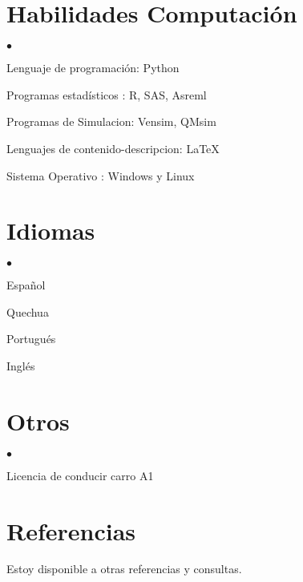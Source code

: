 \documentclass[margin,line,10pt]{res}
\newenvironment{list2}{
  \begin{list}{$\bullet$}{%
      \setlength{\itemsep}{0in}
      \setlength{\parsep}{0in} \setlength{\parskip}{0in}
      \setlength{\topsep}{0in} \setlength{\partopsep}{0in} 
      \setlength{\leftmargin}{0.2in}}}{\end{list}}
\begin{document}
\begin{resume}
\section{\sc Habilidades Computación} 
\begin{list2}
\item Lenguaje de programación: Python
\vspace{0.3cm}
\item Programas estadísticos : R, SAS, Asreml
\vspace{0.3cm}
\item Programas de Simulacion: Vensim, QMsim
\vspace{0.3cm}
\item Lenguajes de contenido-descripcion: \LaTeX
\vspace{0.3cm}
\item Sistema Operativo : Windows y Linux 
\end{list2}

\section{\sc Idiomas} 
\begin{list2}
\vspace{0.3cm}
\item Español
\vspace{0.3cm}
\item Quechua
\vspace{0.3cm}
\item Portugués
\vspace{0.3cm}
\item Inglés
\end{list2}

\section{\sc Otros}
\begin{list2}
\item Licencia de conducir carro A1\\
\end{list2}

\section{\sc Referencias}
Estoy disponible a otras referencias y consultas. 

\end{resume}
\end{document}
